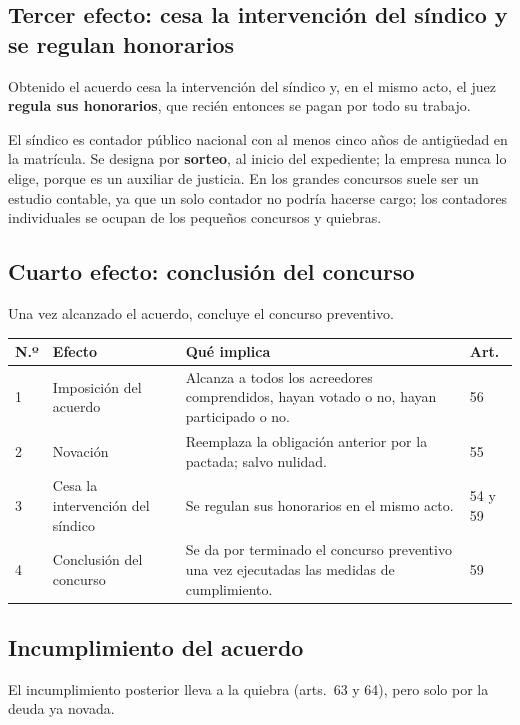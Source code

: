 \documentclass[12pt,oneside]{book}
\begin{document}
\subsection{Tercer efecto: cesa la intervención del síndico y se regulan honorarios}

Obtenido el acuerdo cesa la intervención del síndico y, en el mismo acto, el juez \textbf{regula sus honorarios}, que recién entonces se pagan por todo su trabajo.

El síndico es contador público nacional con al menos cinco años de antigüedad en la matrícula. Se designa por \textbf{sorteo}, al inicio del expediente; la empresa nunca lo elige, porque es un auxiliar de justicia. En los grandes concursos suele ser un estudio contable, ya que un solo contador no podría hacerse cargo; los contadores individuales se ocupan de los pequeños concursos y quiebras.

\subsection{Cuarto efecto: conclusión del concurso}

Una vez alcanzado el acuerdo, concluye el concurso preventivo.

\begin{center}
\small
\begin{tabularx}{\textwidth}{P{1.2cm} P{3.4cm} Y P{1.6cm}}
\toprule
\textbf{N.º} & \textbf{Efecto} & \textbf{Qué implica} & \textbf{Art.} \\
 & Imposición del acuerdo & Alcanza a todos los acreedores comprendidos, hayan votado o no, hayan participado o no. & 56 \\
2 & Novación & Reemplaza la obligación anterior por la pactada; salvo nulidad. & 55 \\
3 & Cesa la intervención del síndico & Se regulan sus honorarios en el mismo acto. & 54 y 59 \\
4 & Conclusión del concurso & Se da por terminado el concurso preventivo una vez ejecutadas las medidas de cumplimiento. & 59 \\
\bottomrule
\end{tabularx}
\end{center}

\subsection{Incumplimiento del acuerdo}

El incumplimiento posterior lleva a la quiebra (arts.\ 63 y 64), pero solo por la deuda ya novada.
\end{document}
